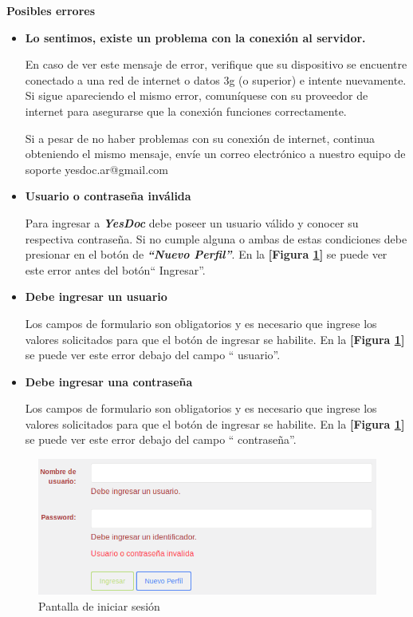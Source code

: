 \textbf{Posibles errores}
\begin{itemize}
	\item \textbf{Lo sentimos, existe un problema con la conexión al servidor.}
	
	En caso de ver este mensaje de error, verifique que su dispositivo se encuentre conectado a una red de internet o datos 3g (o superior) e intente nuevamente. Si sigue apareciendo el mismo error, comuníquese con su proveedor de internet para asegurarse que la conexión funciones correctamente.
	
	Si a pesar de no haber problemas con su conexión de internet, continua obteniendo el mismo mensaje, envíe un correo electrónico a nuestro equipo de soporte yesdoc.ar@gmail.com
	
	\item \textbf{Usuario o contraseña inválida}
	
	Para ingresar a \textbf{\textit{YesDoc}} debe poseer un usuario válido y conocer su respectiva contraseña. Si no cumple alguna o ambas de estas condiciones debe presionar en el botón de \textbf{\textit{``Nuevo Perfil''}}. En la \textbf{[Figura \ref{mu-us_invalido_ingresar_caracteres}]} se puede ver este error antes del botón`` Ingresar''.
	
	\item \textbf{Debe ingresar un usuario}
	
	Los campos de formulario son obligatorios y es necesario que ingrese los valores solicitados para que el botón de ingresar se habilite. En la \textbf{[Figura \ref{mu-us_invalido_ingresar_caracteres}]} se puede ver este error debajo del campo `` usuario''.
	
	\item \textbf{Debe ingresar una contraseña}
	
	Los campos de formulario son obligatorios y es necesario que ingrese los valores solicitados para que el botón de ingresar se habilite.	 En la \textbf{[Figura \ref{mu-us_invalido_ingresar_caracteres}]} se puede ver este error debajo del campo `` contraseña''.
\end{itemize}
 \begin{figure}
 	\centering
 	\includegraphics[width=.8\textwidth]{img/manual_de_usuario/us_invalido_ingresar_caracteres}
 	\caption{Pantalla de iniciar sesión}
 	\label{mu-us_invalido_ingresar_caracteres}
 \end{figure}

